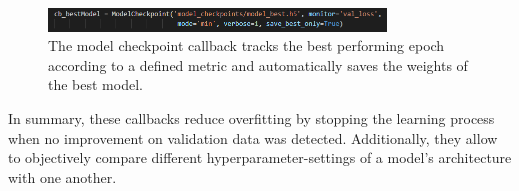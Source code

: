 \begin{figure}[H]
  \begin{center}
  \includegraphics[angle=0, width=0.8\textwidth]{Figures/ModelCheckpoint.PNG}
  \caption[Model checkpoint callback]{The model checkpoint callback tracks the best performing epoch according to a defined metric and automatically saves the weights of the best model.}
  \label{fig:ModelCheckpoint}
  \end{center}
\end{figure}

In summary, these callbacks reduce overfitting by stopping the learning process when no improvement on validation data was detected. Additionally, they allow to objectively compare different hyperparameter-settings of a model's architecture with one another.
